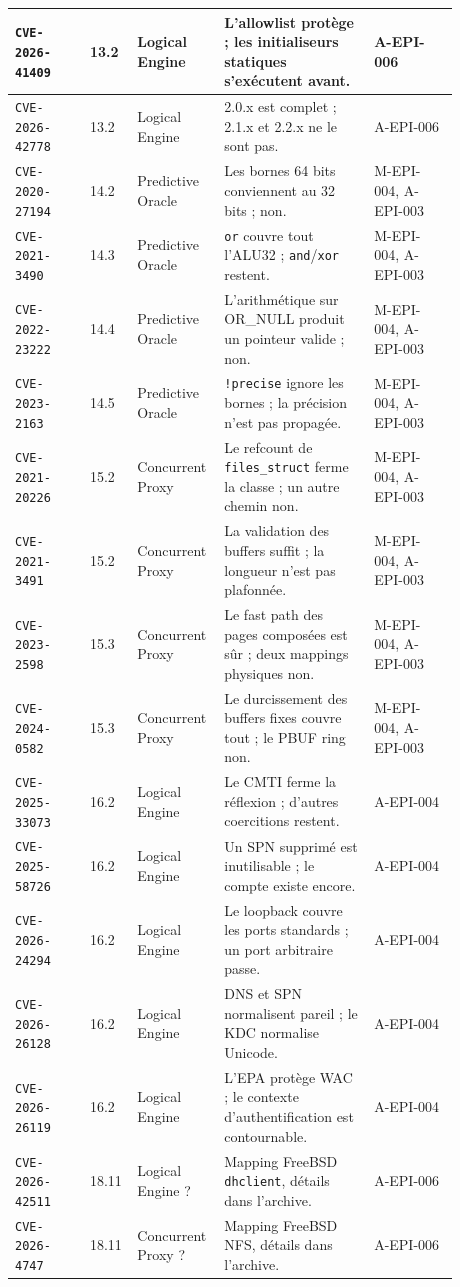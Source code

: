 \documentclass{training}
\begin{document}
\begin{center}
\begin{longtable}{|p{0.16\linewidth}|p{0.06\linewidth}|p{0.16\linewidth}|p{0.32\linewidth}|p{0.18\linewidth}|}
\texttt{CVE-2026-41409} & 13.2 & Logical Engine & L'allowlist protège ; les
initialiseurs statiques s'exécutent avant. & A-EPI-006 \\ \hline
\texttt{CVE-2026-42778} & 13.2 & Logical Engine & 2.0.x est complet ; 2.1.x et
2.2.x ne le sont pas. & A-EPI-006 \\ \hline
\texttt{CVE-2020-27194} & 14.2 & Predictive Oracle & Les bornes 64 bits
conviennent au 32 bits ; non. & M-EPI-004, A-EPI-003 \\ \hline
\texttt{CVE-2021-3490} & 14.3 & Predictive Oracle & \texttt{or} couvre tout
l'ALU32 ; \texttt{and}/\texttt{xor} restent. & M-EPI-004, A-EPI-003 \\ \hline
\texttt{CVE-2022-23222} & 14.4 & Predictive Oracle & L'arithmétique sur
OR\_NULL produit un pointeur valide ; non. & M-EPI-004, A-EPI-003 \\ \hline
\texttt{CVE-2023-2163} & 14.5 & Predictive Oracle & \texttt{!precise} ignore
les bornes ; la précision n'est pas propagée. & M-EPI-004, A-EPI-003 \\ \hline
\texttt{CVE-2021-20226} & 15.2 & Concurrent Proxy & Le refcount de
\texttt{files\_struct} ferme la classe ; un autre chemin non. & M-EPI-004,
A-EPI-003 \\ \hline
\texttt{CVE-2021-3491} & 15.2 & Concurrent Proxy & La validation des buffers
suffit ; la longueur n'est pas plafonnée. & M-EPI-004, A-EPI-003 \\ \hline
\texttt{CVE-2023-2598} & 15.3 & Concurrent Proxy & Le fast path des pages
composées est sûr ; deux mappings physiques non. & M-EPI-004, A-EPI-003 \\ \hline
\texttt{CVE-2024-0582} & 15.3 & Concurrent Proxy & Le durcissement des buffers
fixes couvre tout ; le PBUF ring non. & M-EPI-004, A-EPI-003 \\ \hline
\texttt{CVE-2025-33073} & 16.2 & Logical Engine & Le CMTI ferme la réflexion ;
d'autres coercitions restent. & A-EPI-004 \\ \hline
\texttt{CVE-2025-58726} & 16.2 & Logical Engine & Un SPN supprimé est
inutilisable ; le compte existe encore. & A-EPI-004 \\ \hline
\texttt{CVE-2026-24294} & 16.2 & Logical Engine & Le loopback couvre les ports
standards ; un port arbitraire passe. & A-EPI-004 \\ \hline
\texttt{CVE-2026-26128} & 16.2 & Logical Engine & DNS et SPN normalisent
pareil ; le KDC normalise Unicode. & A-EPI-004 \\ \hline
\texttt{CVE-2026-26119} & 16.2 & Logical Engine & L'EPA protège WAC ; le
contexte d'authentification est contournable. & A-EPI-004 \\ \hline
\texttt{CVE-2026-42511} & 18.11 & Logical Engine ? & Mapping FreeBSD
\texttt{dhclient}, détails dans l'archive. & A-EPI-006 \\ \hline
\texttt{CVE-2026-4747} & 18.11 & Concurrent Proxy ? & Mapping FreeBSD NFS,
détails dans l'archive. & A-EPI-006 \\ \hline
\end{longtable}
\normalsize
\end{center}
\end{document}
